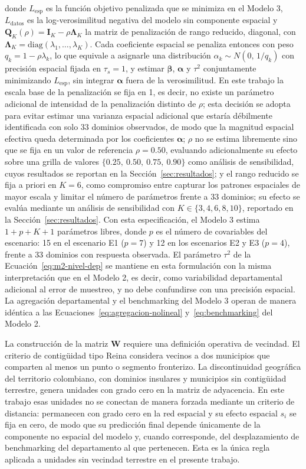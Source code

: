 \noindent donde $L_{\text{esp}}$ es la función objetivo penalizada que se minimiza en el Modelo 3, $L_{\text{datos}}$ es la log-verosimilitud negativa del modelo sin componente espacial y $\mathbf{Q}_K(\rho)=\mathbf{I}_K-\rho\boldsymbol{\Lambda}_K$ la matriz de penalización de rango reducido, diagonal, con $\boldsymbol{\Lambda}_K=\text{diag}(\lambda_1,\dots,\lambda_K)$. Cada coeficiente espacial se penaliza entonces con peso $q_k=1-\rho\lambda_k$, lo que equivale a asignarle una distribución $\alpha_k\sim N(0,\,1/q_k)$ con precisión espacial fijada en $\tau_s=1$, y estimar $\boldsymbol{\beta}$, $\boldsymbol{\alpha}$ y $\tau^2$ conjuntamente minimizando $L_{\text{esp}}$, sin integrar $\boldsymbol{\alpha}$ fuera de la verosimilitud. En este trabajo la escala base de la penalización se fija en 1, es decir, no existe un parámetro adicional de intensidad de la penalización distinto de $\rho$; esta decisión se adopta para evitar estimar una varianza espacial adicional que estaría débilmente identificada con solo 33 dominios observados, de modo que la magnitud espacial efectiva queda determinada por los coeficientes $\boldsymbol{\alpha}$; $\rho$ no se estima libremente sino que se fija en un valor de referencia $\rho=0.50$, evaluando adicionalmente su efecto sobre una grilla de valores $\{0.25,\ 0.50,\ 0.75,\ 0.90\}$ como análisis de sensibilidad, cuyos resultados se reportan en la Sección~\ref{sec:resultados}; y el rango reducido se fija a priori en $K=6$, como compromiso entre capturar los patrones espaciales de mayor escala y limitar el número de parámetros frente a 33 dominios; su efecto se evalúa mediante un análisis de sensibilidad con $K\in\{3,4,6,8,10\}$, reportado en la Sección~\ref{sec:resultados}. Con esta especificación, el Modelo 3 estima $1+p+K+1$ parámetros libres, donde $p$ es el número de covariables del escenario: 15 en el escenario E1 ($p=7$) y 12 en los escenarios E2 y E3 ($p=4$), frente a 33 dominios con respuesta observada. El parámetro $\tau^2$ de la Ecuación~\ref{eq:m2-nivel-dep} se mantiene en esta formulación con la misma interpretación que en el Modelo 2, es decir, como variabilidad departamental adicional al error de muestreo, y no debe confundirse con una precisión espacial. La agregación departamental y el benchmarking del Modelo 3 operan de manera idéntica a las Ecuaciones~\ref{eq:agregacion-nolineal} y~\ref{eq:benchmarking} del Modelo 2.

La construcción de la matriz $\mathbf{W}$ requiere una definición operativa de vecindad. El criterio de contigüidad tipo Reina considera vecinos a dos municipios que comparten al menos un punto o segmento fronterizo. La discontinuidad geográfica del territorio colombiano, con dominios insulares y municipios sin contigüidad terrestre, genera unidades con grado cero en la matriz de adyacencia. En este trabajo esas unidades no se conectan de manera forzada mediante un criterio de distancia: permanecen con grado cero en la red espacial y su efecto espacial $s_i$ se fija en cero, de modo que su predicción final depende únicamente de la componente no espacial del modelo y, cuando corresponde, del desplazamiento de benchmarking del departamento al que pertenecen. Esta es la única regla aplicada a unidades sin vecindad terrestre en el presente trabajo.

